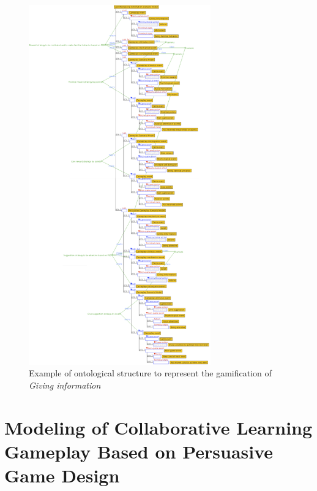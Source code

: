 \begin{figure}[!htb]
 \caption{Example of ontological structure to represent the gamification of \emph{Giving information}}
 \label{fig:ontological-structure-gamified-giving-information-scenario-model}
 \centering
 \includegraphics[width=0.7\textwidth]{images/chap-ontogacles2/ontological-structure-gamified-giving-information-scenario-model.png}
 \fautor
\end{figure}
\newpage

\section[Modeling of CL Gameplay Based on Persuasive Game Design]{Modeling of Collaborative Learning Gameplay Based on Persuasive Game Design}
\label{sec:modeling-cl-gameplay-persuasive-game-design}

